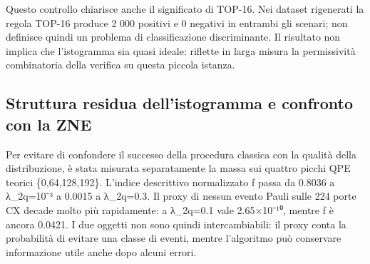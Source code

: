 Questo controllo chiarisce anche il significato di TOP-16. Nei dataset rigenerati la regola TOP-16 produce 2 000 positivi e 0 negativi in entrambi gli scenari; non definisce quindi un problema di classificazione discriminante. Il risultato non implica che l'istogramma sia quasi ideale: riflette in larga misura la permissività combinatoria della verifica su questa piccola istanza.

\subsection{Struttura residua dell'istogramma e confronto con la ZNE}\label{sec:finale_5_1_4}\label{sec:parametri_mitigazione}

Per evitare di confondere il successo della procedura classica con la qualità della distribuzione, è stata misurata separatamente la massa sui quattro picchi QPE teorici \{0,64,128,192\}. L'indice descrittivo normalizzato f passa da 0.8036 a λ\_2q=10⁻³ a 0.0015 a λ\_2q=0.3. Il proxy di nessun evento Pauli sulle 224 porte CX decade molto più rapidamente: a λ\_2q=0.1 vale 2.65×10⁻¹⁰, mentre f è ancora 0.0421. I due oggetti non sono quindi intercambiabili: il proxy conta la probabilità di evitare una classe di eventi, mentre l'algoritmo può conservare informazione utile anche dopo alcuni errori.

